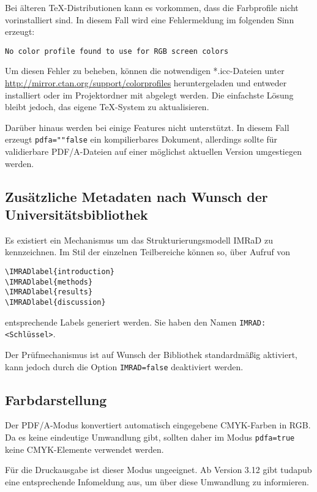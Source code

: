 \documentclass[
	german,
	accentcolor=9c,%
	]{tudapub}
\let\code\texttt
\let\cls\textsf
\begin{document}

Bei älteren \TeX-Distributionen kann es vorkommen, dass die Farbprofile nicht vorinstalliert sind. In diesem Fall wird eine Fehlermeldung im folgenden Sinn erzeugt:
\begin{verbatim}
No color profile found to use for RGB screen colors
\end{verbatim}
Um diesen Fehler zu beheben, können die notwendigen *.icc-Dateien unter \url{http://mirror.ctan.org/support/colorprofiles} heruntergeladen und entweder installiert oder im Projektordner mit abgelegt werden. Die einfachste Lösung bleibt jedoch, das eigene \TeX-System zu aktualisieren.

Darüber hinaus werden bei  einige Features nicht unterstützt. In diesem Fall erzeugt \code{pdfa=""false} ein kompilierbares Dokument, allerdings sollte für validierbare PDF/A-Dateien auf  einer möglichst aktuellen Version umgestiegen werden.

\subsection{Zusätzliche Metadaten nach Wunsch der Universitätsbibliothek}
\label{sec:IMRAD}
Es existiert ein Mechanismus um das Strukturierungsmodell IMRaD \cite{imrad} zu kennzeichnen.
Im Stil der einzelnen Teilbereiche können so, über Aufruf von

\begin{verbatim}
\IMRADlabel{introduction}
\IMRADlabel{methods}
\IMRADlabel{results}
\IMRADlabel{discussion}
\end{verbatim}
entsprechende Labels generiert werden. Sie haben den Namen \code{IMRAD:<Schlüssel>}.

Der Prüfmechanismus ist auf Wunsch der Bibliothek standardmäßig aktiviert, kann jedoch durch die Option \code{IMRAD=false} deaktiviert werden.

\subsection{Farbdarstellung}
\label{sec:pdfa-color}
Der PDF/A-Modus konvertiert automatisch eingegebene CMYK-Farben in RGB. Da es keine eindeutige Umwandlung gibt, sollten daher im Modus \code{pdfa=true} keine CMYK-Elemente verwendet werden.

Für die Druckausgabe ist dieser Modus ungeeignet. Ab Version 3.12 gibt \cls{tudapub} eine entsprechende Infomeldung aus, um über diese Umwandlung zu informieren.
\end{document}
